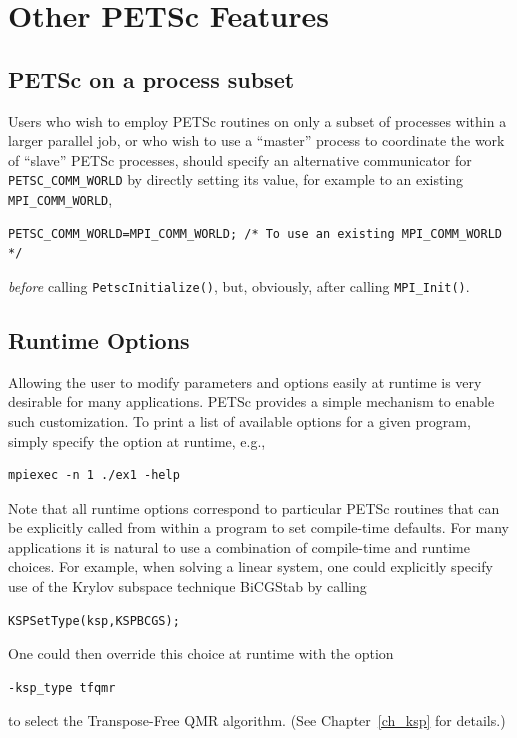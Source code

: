 {{{%
\cleardoublepage
\chapter{Other PETSc Features}

\section{PETSc on a process subset}

Users who wish to employ PETSc routines on only a subset
of processes within a larger parallel job, or who wish to use a
``master'' process to coordinate the work of ``slave'' PETSc
processes, should specify an alternative communicator for \lstinline{PETSC_COMM_WORLD} by directly setting its value, for example to an existing \lstinline{MPI_COMM_WORLD},
\begin{lstlisting}
PETSC_COMM_WORLD=MPI_COMM_WORLD; /* To use an existing MPI_COMM_WORLD */
\end{lstlisting}
{\em before} calling \lstinline{PetscInitialize()}, but, obviously, after
calling \lstinline{MPI_Init()}.

\section{Runtime Options}  
\label{sec_options}

Allowing the user to modify parameters and options easily at runtime
is very desirable for many applications.  PETSc provides a simple
mechanism to enable such customization.  To print a list of
available options for a given program, simply specify the option
 at runtime, e.g., 
\begin{lstlisting}
mpiexec -n 1 ./ex1 -help
\end{lstlisting}

Note that all runtime options correspond to particular PETSc routines
that can be explicitly called from within a program to set compile-time
defaults.   For many applications it is natural to use a combination
of compile-time and runtime choices.  For example, when solving a linear
system, one could explicitly specify use of the Krylov subspace
technique BiCGStab by calling
\begin{lstlisting}
KSPSetType(ksp,KSPBCGS);
\end{lstlisting}
One could then override this choice at runtime with the option
\begin{lstlisting}
-ksp_type tfqmr
\end{lstlisting}
to select the Transpose-Free QMR algorithm. (See Chapter~\ref{ch_ksp} for details.)

}}}
